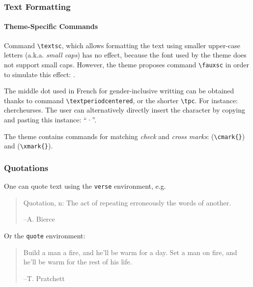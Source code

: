 \documentclass[10pt,    %
    english,            %
    xcolor=table,       %
    envcountsect,       %
    aspectratio=43      %
]{beamer}
\begin{document}
\begin{frame}
    \frametitle{Text Formatting} 
    \framesubtitle{Theme-Specific Commands} 
    
    Command \texttt{\textbackslash{}textsc}, which allows formatting the text using smaller upper-case letters (a.k.a. \textit{small caps}) has no effect, because the font used by the theme does not support small caps. However, the theme proposes command \texttt{\textbackslash{}fauxsc} in order to simulate this effect: .
    
    \medskip
    The middle dot used in French for gender-inclusive writting can be obtained thanks to command \texttt{\textbackslash{}textperiodcentered}, or the shorter \texttt{\textbackslash{}tpc}. For instance: chercheur\textperiodcentered{}se\tpc{}s. The user can alternatively directly insert the character by copying and pasting this instance: ``·''.

    \medskip
    The theme contains commands for matching \textit{check} and \textit{cross marks}: \cmark{} (\texttt{\textbackslash{}cmark\{\}}) and \xmark{} (\texttt{\textbackslash{}xmark\{\}}).
\end{frame}
    
\begin{frame}
    \frametitle{Quotations}
    
    One can quote text using the \texttt{verse} environment, e.g.
    \begin{verse}
        Quotation, n: The act of repeating erroneously the words of another. \\ 
        \vspace{-0.5cm}
        \begin{flushright}--A. Bierce\end{flushright}
    \end{verse}
    
    Or the \texttt{quote} environment:
    \begin{quote}
        Build a man a fire, and he'll be warm for a day. Set a man on fire, and he'll be warm for the rest of his life. \\ 
        \begin{flushright}--T. Pratchett\end{flushright}
    \end{quote}
\end{frame}
    
\end{document}
